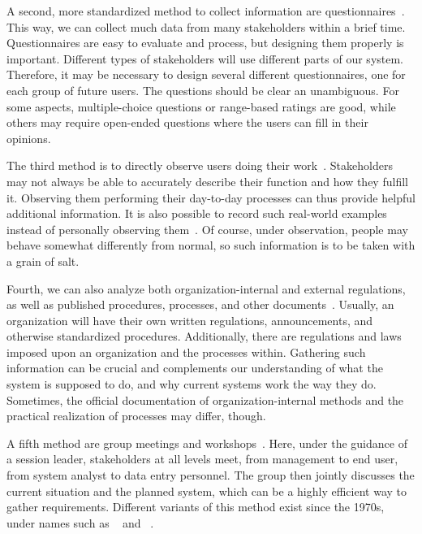 A second, more standardized method to collect information are questionnaires~\cite{TAE2008ISRTDQTSTDQSSAE,S2003ISA6P:RDARS}.
This way, we can collect much data from many stakeholders within a brief time.
Questionnaires are easy to evaluate and process, but designing them properly is important.
Different types of stakeholders will use different parts of our system.
Therefore, it may be necessary to design several different questionnaires, one for each group of future users.
The questions should be clear an unambiguous.
For some aspects, multiple-choice questions or range-based ratings are good, while others may require open-ended questions where the users can fill in their opinions.

The third method is to directly observe users doing their work~\cite{SGGM2007TMSPATFISRDWS,S2003ISA6P:RDARS}.
Stakeholders may not always be able to accurately describe their function and how they fulfill it.
Observing them performing their day-to-day processes can thus provide helpful additional information.
It is also possible to record such real-world examples instead of personally observing them~\cite{HPW1998REAVWRWS}.
Of course, under observation, people may behave somewhat differently from normal, so such information is to be taken with a grain of salt.

Fourth, we can also analyze both organization-internal and external regulations, as well as published procedures, processes, and other documents~\cite{RGJ2023EASARBFSAR,S2003ISA6P:RDARS}.
Usually, an organization will have their own written regulations, announcements, and otherwise standardized procedures.
Additionally, there are regulations and laws imposed upon an organization and the processes within.
Gathering such information can be crucial and complements our understanding of what the system is supposed to do, and why current systems work the way they do.
Sometimes, the official documentation of organization-internal methods and the practical realization of processes may differ, though.

A fifth method are group meetings and workshops~\cite{S2003ISA6P:RDARS}.
Here, under the guidance of a session leader, stakeholders at all levels meet, from management to end user, from system analyst to data entry personnel.
The group then jointly discusses the current situation and the planned system, which can be a highly efficient way to gather requirements.
Different variants of this method exist since the 1970s, under names such as ~\cite{CWG1993PAJADATC,M1996RTWSS} and ~\cite{CWG1993PAJADATC,FMRSW1989OOSAATSDASD}.

